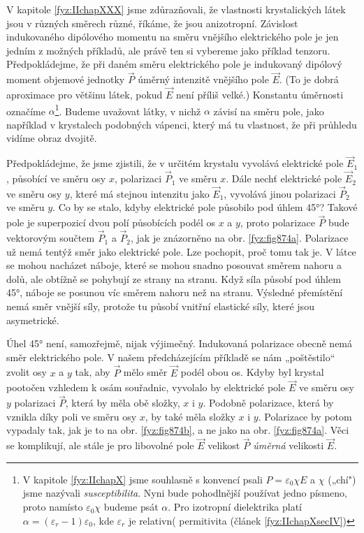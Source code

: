     V kapitole \ref{fyz:IIchapXXX} jsme zdůrazňovali, že vlastnosti krystalických látek jsou v
    různých směrech různé, říkáme, že jsou anizotropní. Závislost indukovaného dipólového momentu na
    směru vnějšího elektrického pole je jen jedním z možných příkladů, ale právě ten si vybereme
    jako příklad tenzoru. Předpokládejme, že při daném směru elektrického pole je indukovaný
    dipólový moment objemové jednotky \(\vec{P}\) úměrný intenzitě vnějšího pole \(\vec{E}\). (To je
    dobrá aproximace pro většinu látek, pokud \(\vec{E}\) není příliš velké.) Konstantu úměrnosti
    označíme \(\alpha\)\footnote{V kapitole \ref{fyz:IIchapX} jsme souhlasně s konvencí psali
    \(P=\varepsilon_0\chi E\) a \(\chi\) („chí") jsme nazývali \emph{susceptibilita}. Nyni bude
    pohodlnější používat jedno písmeno, proto namísto \(\varepsilon_0\chi\) budeme psát \(\alpha\).
    Pro izotropní dielektrika platí \(\alpha = (\varepsilon_r - 1)\varepsilon_0\), kde
    \(\varepsilon_r\) je relativn( permitivita (článek \ref{fyz:IIchapXsecIV})}. Budeme uvažovat
    látky, v nichž \(\alpha\) závisí na směru pole, jako například v krystalech podobných vápenci,
    který má tu vlastnost, že při průhledu vidíme obraz dvojitě. 

    Předpokládejme, že jsme zjistili, že v určitém krystalu vyvolává elektrické pole \(\vec{E}_1\),
    působící ve směru osy \(x\), polarizaci \(\vec{P}_1\) ve směru \(x\). Dále nechť elektrické pole
    \(\vec{E}_2\) ve směru osy \(y\), které má stejnou intenzitu jako \(\vec{E}_1\), vyvolává jinou
    polarizaci \(\vec{P}_2\) ve směru \(y\). Co by se stalo, kdyby elektrické pole působilo pod
    úhlem \ang{45}? Takové pole je superpozicí dvou polí působících podél os \(x\) a \(y\), proto
    polarizace \(\vec{P}\) bude vektorovým součtem \(\vec{P}_1\) a \(\vec{P}_2\), jak je znázorněno
    na obr. \ref{fyz:fig874a}. Polarizace už nemá tentýž směr jako elektrické pole. Lze pochopit,
    proč tomu tak je. V látce se mohou nacházet náboje, které se mohou snadno posouvat směrem nahoru
    a dolů, ale obtížně se pohybují ze strany na stranu. Když síla působí pod úhlem \ang{45}, náboje
    se posunou víc směrem nahoru než na stranu. Výsledné přemístění nemá směr vnější síly, protože
    tu působí vnitřní elastické síly, které jsou asymetrické.
    
    Úhel \ang{45} není, samozřejmě, nijak výjimečný. Indukovaná polarizace obecně nemá směr
    elektrického pole. V našem předcházejícím příkladě se nám „poštěstilo“ zvolit osy \(x\) a \(y\)
    tak, aby \(\vec{P}\) mělo směr \(\vec{E}\) podél obou os. Kdyby byl krystal pootočen vzhledem k
    osám souřadnic, vyvolalo by elektrické pole \(\vec{E}\) ve směru osy \(y\) polarizaci
    \(\vec{P}\), která by měla obě složky, \(x\) i \(y\). Podobně polarizace, která by vznikla díky
    poli ve směru osy \(x\), by také měla složky \(x\) i \(y\). Polarizace by potom vypadaly tak,
    jak je to na obr. \ref{fyz:fig874b}, a ne jako na obr. \ref{fyz:fig874a}. Věci se komplikují,
    ale stále je pro libovolné pole \(\vec{E}\) velikost \(\vec{P}\) \emph{úměrná} velikosti
    \(\vec{E}\). 
    

